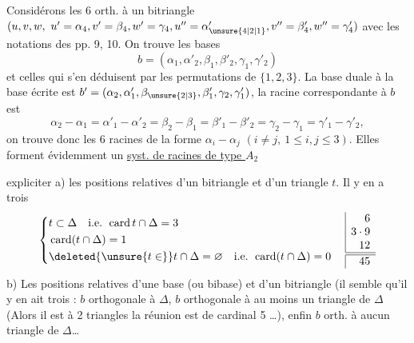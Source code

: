 Considérons les 6   orth. à un bitriangle $(u,v,w,\ u'=\alpha_4,v'=\beta_4,w'=\gamma_4,u''=\alpha'_{\unsure{4|2|1}},v''=\beta'_4,w''=\gamma'_4)$  avec les notations des pp. 9, 10. On trouve les bases 
\[
b=(\alpha_1,\alpha'_2,\beta_1,\beta'_2,\gamma_1,\gamma'_2)
\]
et celles qui s'en déduisent par les  permutations de $\{1,2,3\}$. La base duale à la base écrite est $b'=(\alpha_2,\alpha'_1,\beta_{\unsure{2|3}},\beta'_1,\gamma_2,\gamma'_1)$, la racine correspondante à $b$ est
\[
\alpha_2-\alpha_1=\alpha'_1-\alpha'_2=\beta_2-\beta_1=\beta'_1-\beta'_2=\gamma_2-\gamma_1=\gamma'_1-\gamma'_2,
\]
on trouve donc les 6 racines de la forme $\alpha_i-\alpha_j$ $(i\ne j,\ 1\le i,j\le3)$. Elles forment évidemment un \uline{syst. de racines de type $A_2$}

expliciter a) les positions relatives d'un bitriangle \inserted{$\Delta$} et d'un triangle $t$. Il y en a trois
\[
\left\{\begin{aligned}
&t\subset\Delta\quad\text{i.e. }\operatorname{card}t\cap\Delta=3\\
&\operatorname{card}(t\cap\Delta)=1\\
&\deleted{\unsure{t\in}}t\cap\Delta=\varnothing\quad\text{i.e. }\operatorname{card}(t\cap\Delta)=0
\end{aligned}\right.
\quad\begin{array}{|r}6\\3\cdot9\\12\\\hline\hline45\end{array}
\]
b) Les positions relatives d'une base (ou bibase) et d'un bitriangle (il semble qu'il y en ait trois : $b$ orthogonale à $\Delta$, $b$  orthogonale à au moins un triangle de $\Delta$ (Alors il est  à  2 triangles  la réunion est de cardinal 5 \ldots), enfin $b$ orth. à aucun triangle de $\Delta$\ldots
